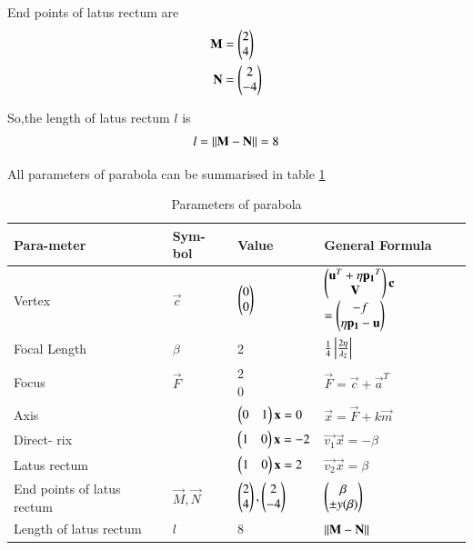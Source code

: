 \documentclass[journal,12pt,twocolumn]{IEEEtran}
\begin{document}
End points of latus rectum are
\begin{align}
\mathbf{M} &= \begin{pmatrix}2\\4\end{pmatrix}
\\
\mathbf{N} &= \begin{pmatrix}2\\-4\end{pmatrix}
\end{align}

So,the length of latus rectum $l$ is 
\begin{align}
l = \left\lVert\mathbf{M}-\mathbf{N}\right\rVert = 8
\end{align}

All parameters of parabola can be summarised in table \ref{tab:table1}

\begin{table}[!ht]
\begin{center}
\begin{tabular}{ | m{1.4cm} | m{1.0cm}| m{2.4cm} | m{2.3cm} | } 
\hline
Para-\newline meter  & Sym-\newline bol  & Value  & General \newline Formula\\ 
\hline
Vertex & $\vec{c}$ & $\begin{pmatrix}0\\0\end{pmatrix}$ & $\begin{pmatrix}\mathbf{u}^T + \eta\mathbf{p_1}^T \\ \mathbf{V}\end{pmatrix}\mathbf{c}$ \newline $= \begin{pmatrix}-f \\ \eta\mathbf{p_1} - \mathbf{u}\end{pmatrix}$ \\ 
\hline
Focal \newline Length & $\beta$ & 2 & $\frac{1}{4}\left\vert\frac{2\eta}{\lambda_2}\right\vert$
\\ 
\hline
Focus & $\vec{F}$ & \myvec{2\\0} & $\vec{F}=\vec{c} + \vec{a}^T$ \\
\hline
Axis &  & $\begin{pmatrix}0 & 1\end{pmatrix}\mathbf{x}=0$ & $\vec{x}=\vec{F}+k\vec{m}$ \\
\hline
Direct- \newline rix & & $\begin{pmatrix}1 & 0\end{pmatrix}\mathbf{x} = -2$ & $\vec{v_1}\vec{x} = -\beta$ \\
\hline
Latus \newline rectum & & $\begin{pmatrix}1 & 0\end{pmatrix}\mathbf{x}=2$ & $\vec{v_2}\vec{x}=\beta$\\
\hline
End \newline points \newline of latus \newline rectum & $\vec{M},\vec{N}$ & $\begin{pmatrix}2\\4\end{pmatrix},\begin{pmatrix}2\\-4\end{pmatrix}$ & $\begin{pmatrix}\beta \\ \pm y(\beta)\end{pmatrix}$ \\
\hline
Length \newline of latus \newline rectum & $l$ & 8 & $\left\lVert\mathbf{M}-\mathbf{N}\right\rVert$\\
\hline
\end{tabular}
\end{center}
\caption{Parameters of parabola}
\label{tab:table1}
\end{table}
\end{document}
